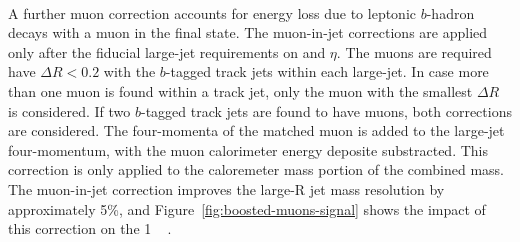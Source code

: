 \paragraph{}
A further muon correction accounts for energy loss due to leptonic $b$-hadron decays with a muon in the final state.
The muon-in-jet corrections are applied only after the fiducial large-\R jet requirements on \pt and $\eta$.
The muons are required have $\Delta R < 0.2$ with the $b$-tagged track jets within each large-\R jet. 
In case more than one muon is found within a track jet, only the muon with the smallest $\Delta R$ is considered. 
If two $b$-tagged track jets are found to have muons, both corrections are considered. 
The four-momenta of the matched muon is added to the large-\R jet four-momentum, with the muon calorimeter energy deposite substracted. 
This correction is only applied to the caloremeter mass portion of the combined mass. 
The muon-in-jet correction improves the large-R jet mass resolution by approximately 5\%, and Figure~\ref{fig:boosted-muons-signal} shows the impact of this correction on the 1 \TeV~ \Grav.

